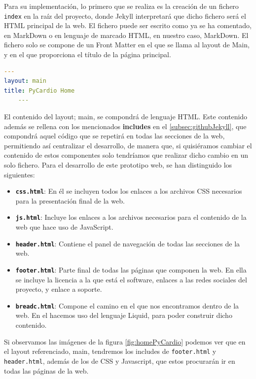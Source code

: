 Para su implementación, lo primero que se realiza es la creación de un fichero \texttt{index} en la raíz del proyecto, donde Jekyll interpretará que dicho fichero será el HTML principal de la web. El fichero puede ser escrito como ya se ha comentado, en MarkDown o en lenguaje de marcado HTML, en nuestro caso, MarkDown. El fichero solo se compone de un Front Matter en el que se llama al layout de Main, y en el que proporciona el título de la página principal.
\begin{lstlisting}[language=yaml,caption=index.md. Fichero de home de PyCardio,label=co]
    ---
layout: main
title: PyCardio Home
    ---
\end{lstlisting}

El contenido del layout; main, se compondrá de lenguaje HTML. Este contenido además se rellena con los mencionados \textbf{includes} en el \ref{subsec:githubJekyll}, que compondrá aquel código que se repetirá en todas las secciones de la web, permitiendo así centralizar el desarrollo, de manera que, si quisiéramos cambiar el contenido de estos componentes solo tendríamos que realizar dicho cambio en un solo fichero. Para el desarrollo de este prototipo web, se han distinguido los siguientes:
\begin{itemize}
    \item \textbf{\texttt{css.html}}: En él se incluyen todos los enlaces a los archivos CSS necesarios para la presentación final de la web.
    \item \textbf{\texttt{js.html}}: Incluye los enlaces a los archivos necesarios para el contenido de la web que hace uso de JavaScript.
    \item \textbf{\texttt{header.html}}: Contiene el panel de navegación de todas las secciones de la web.
    \item \textbf{\texttt{footer.html}}: Parte final de todas las páginas que componen la web. En ella se incluye la licencia a la que está el software, enlaces a las redes sociales del proyecto, y enlace a soporte.
    \item \textbf{\texttt{breadc.html}}: Compone el camino en el que nos encontramos dentro de la web. En el hacemos uso del lenguaje Liquid, para poder construir dicho contenido. 
\end{itemize}

Si observamos las imágenes de la figura \ref{fig:homePyCardio} podemos ver que en el layout referenciado, main, tendremos los includes de \texttt{footer.html} y \texttt{header.html}, además de los de CSS y Javascript, que estos procurarán ir en todas las páginas de la web. 

